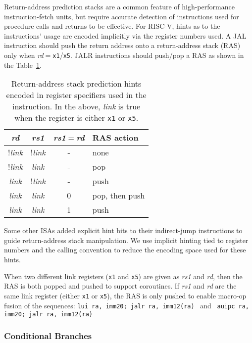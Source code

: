 Return-address prediction stacks are a common feature of
high-performance instruction-fetch units, but require accurate
detection of instructions used for procedure calls and returns to be
effective.  For RISC-V, hints as to the instructions' usage are encoded
implicitly via the register numbers used.  A JAL instruction should
push the return address onto a return-address stack (RAS) only when
{\em rd}$=${\tt x1}/{\tt x5}.  JALR instructions should push/pop a
RAS as shown in the Table~\ref{rashints}.
\begin{table}[hbt]
\centering
\begin{tabular}{|c|c|c|l|}
  \hline
  \em rd & \em rs1 & {\em rs1}$=${\em rd} & RAS action \\
  \hline
  !{\em link} & !{\em link} & - & none \\
  !{\em link} &  {\em link} & - & pop \\
   {\em link} & !{\em link} & - & push  \\
   {\em link} &  {\em link} & 0 & pop, then push \\
   {\em link} &  {\em link} & 1 & push \\
   \hline
\end{tabular}
\caption{Return-address stack prediction hints encoded in register
  specifiers used in the instruction.  In the above, {\em link} is
  true when the register is either {\tt x1} or {\tt x5}.}
\label{rashints}
\end{table}

\begin{commentary}
Some other ISAs added explicit hint bits to their indirect-jump instructions
to guide return-address stack manipulation.  We use implicit hinting tied to
register numbers and the calling convention to reduce the encoding space used
for these hints.

When two different link registers ({\tt x1} and {\tt x5}) are given as
{\em rs1} and {\em rd}, then the RAS is both popped and pushed to
support coroutines.  If {\em rs1} and {\em rd} are the same link
register (either {\tt x1} or {\tt x5}), the RAS is only pushed to
enable macro-op fusion of the sequences:\linebreak
{\tt lui ra, imm20; jalr ra, imm12(ra)} \ and \ 
{\tt auipc ra, imm20; jalr ra, imm12(ra)}
\end{commentary}

\subsubsection*{Conditional Branches}


